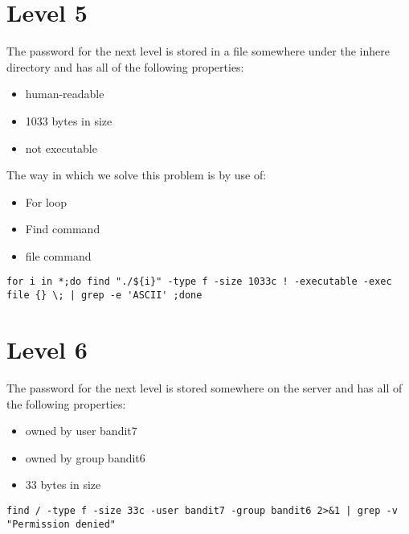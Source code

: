 \documentclass{report}
\begin{document}
    \section*{Level 5}
    \bigbreak \noindent 
    The password for the next level is stored in a file somewhere under the inhere directory and has all of the following properties:
    \begin{itemize}
        \item human-readable
        \item 1033 bytes in size
        \item not executable
    \end{itemize}
    \bigbreak \noindent 
    The way in which we solve this problem is by use of:
    \begin{itemize}
        \item For loop
        \item Find command 
        \item file command
    \end{itemize}
    \bigbreak \noindent 
    \begin{verbatim}
for i in *;do find "./${i}" -type f -size 1033c ! -executable -exec file {} \; | grep -e 'ASCII' ;done
    \end{verbatim}
    \bigbreak \noindent

    \bigbreak \noindent 
    \section*{Level 6}
    \bigbreak \noindent 
    The password for the next level is stored somewhere on the server and has all of the following properties:
    \begin{itemize}
        \item owned by user bandit7
        \item owned by group bandit6
        \item 33 bytes in size
    \end{itemize}
    \bigbreak \noindent 
    \begin{verbatim}
find / -type f -size 33c -user bandit7 -group bandit6 2>&1 | grep -v "Permission denied"
    \end{verbatim}
    \bigbreak \noindent
\end{document}
